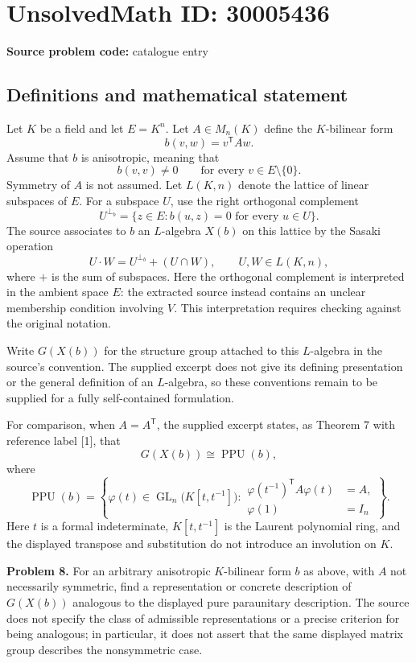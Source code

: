 \documentclass[11pt]{article}
\begin{document}
\section*{UnsolvedMath ID: 30005436}
\textbf{Source problem code:} catalogue entry
\subsection{Definitions and mathematical statement}
Let \(K\) be a field and let \(E=K^n\). Let \(A\in M_n(K)\) define the \(K\)-bilinear form
\[
 b(v,w)=v^{\mathsf T}Aw.
\]
Assume that \(b\) is anisotropic, meaning that
\[
 b(v,v)\ne 0\qquad\text{for every }v\in E\setminus\{0\}.
\]
Symmetry of \(A\) is not assumed. Let \(L(K,n)\) denote the lattice of linear subspaces of \(E\). For a subspace \(U\), use the right orthogonal complement
\[
 U^{\perp_b}=\{z\in E: b(u,z)=0\text{ for every }u\in U\}.
\]
The source associates to \(b\) an \(L\)-algebra \(X(b)\) on this lattice by the Sasaki operation
\[
 U\mathbin{\cdot}W=U^{\perp_b}+(U\cap W),
 \qquad U,W\in L(K,n),
\]
where \(+\) is the sum of subspaces. Here the orthogonal complement is interpreted in the ambient space \(E\): the extracted source instead contains an unclear membership condition involving \(V\). This interpretation requires checking against the original notation.

Write \(G(X(b))\) for the structure group attached to this \(L\)-algebra in the source's convention. The supplied excerpt does not give its defining presentation or the general definition of an \(L\)-algebra, so these conventions remain to be supplied for a fully self-contained formulation.

For comparison, when \(A=A^{\mathsf T}\), the supplied excerpt states, as Theorem 7 with reference label [1], that
\[
 G(X(b))\cong\operatorname{PPU}(b),
\]
where
\[
 \operatorname{PPU}(b)=
 \left\{\varphi(t)\in\operatorname{GL}_n\bigl(K[t,t^{-1}]\bigr):
 \begin{aligned}
 \varphi(t^{-1})^{\mathsf T}A\varphi(t)&=A,\\
 \varphi(1)&=I_n
 \end{aligned}
 \right\}.
\]
Here \(t\) is a formal indeterminate, \(K[t,t^{-1}]\) is the Laurent polynomial ring, and the displayed transpose and substitution do not introduce an involution on \(K\).

\textbf{Problem 8.} For an arbitrary anisotropic \(K\)-bilinear form \(b\) as above, with \(A\) not necessarily symmetric, find a representation or concrete description of \(G(X(b))\) analogous to the displayed pure paraunitary description. The source does not specify the class of admissible representations or a precise criterion for being analogous; in particular, it does not assert that the same displayed matrix group describes the nonsymmetric case.
\end{document}

